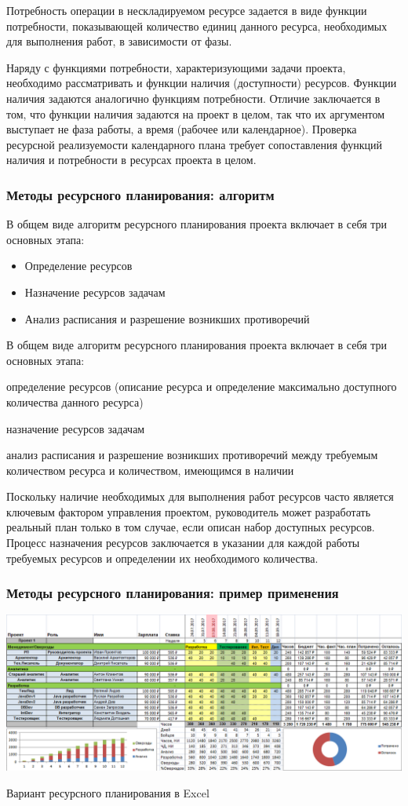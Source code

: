 \documentclass{../industrial-development}
\begin{document}
Потребность операции в нескладируемом ресурсе задается в виде функции потребности, показывающей количество единиц данного ресурса, необходимых для выполнения работ, в зависимости от фазы.

Наряду с функциями потребности, характеризующими задачи проекта, необходимо рассматривать и функции наличия (доступности) ресурсов. Функции наличия задаются аналогично функциям потребности. Отличие заключается в том, что функции наличия задаются на проект в целом, так что их аргументом выступает не фаза работы, а время (рабочее или календарное). Проверка ресурсной реализуемости календарного плана требует сопоставления функций наличия и потребности в ресурсах проекта в целом.

    \begin{frame} \frametitle{Методы ресурсного планирования: алгоритм}
	В общем виде алгоритм ресурсного планирования проекта включает в себя три основных этапа:
	\begin{itemize}
		\item Определение ресурсов
		\item Назначение ресурсов задачам 
		\item Анализ расписания и разрешение возникших противоречий
	\end{itemize}
    \end{frame}
    \lecturenotes 

В общем виде алгоритм ресурсного планирования проекта включает в себя три основных этапа:

определение ресурсов (описание ресурса и определение максимально доступного количества данного ресурса)

назначение ресурсов задачам

анализ расписания и разрешение возникших противоречий между требуемым количеством ресурса и количеством, имеющимся в наличии

Поскольку наличие необходимых для выполнения работ ресурсов часто является ключевым фактором управления проектом, руководитель может разработать реальный план только в том случае, если описан набор доступных ресурсов. Процесс назначения ресурсов заключается в указании для каждой работы требуемых ресурсов и определении их необходимого количества.

    \begin{frame} \frametitle{Методы ресурсного планирования: пример применения}
         \centerline{\includegraphics[width=1\textwidth]{resource.png}}
	\centerline{Вариант ресурсного планирования в Excel}
    \end{frame}
    \lecturenotes
\end{document}
